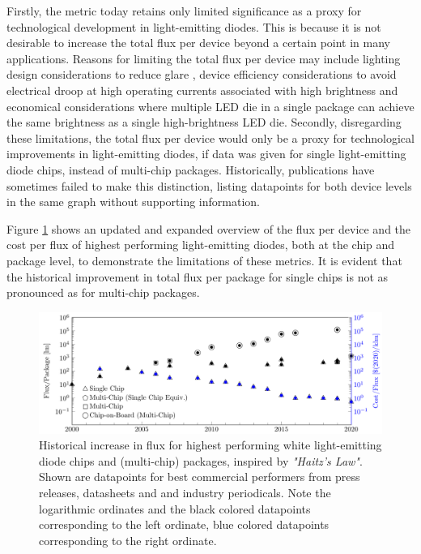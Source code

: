 \documentclass[a4paper,nocompress]{spie}  %
\begin{document}
    Firstly, the metric today retains only limited significance as a proxy for technological development in light-emitting diodes. This is because it is not desirable to increase the total flux per device beyond a certain point in many applications. Reasons for limiting the total flux per device may include lighting design considerations to reduce glare \cite{khan2015led}, device efficiency considerations to avoid electrical droop at high operating currents associated with high brightness \cite{Piprek2010} and economical considerations where multiple LED die in a single package can achieve the same brightness as a single high-brightness LED die. Secondly, disregarding these limitations, the total flux per device would only be a proxy for technological improvements in light-emitting diodes, if data was given for single light-emitting diode chips, instead of multi-chip packages. Historically, publications have sometimes failed to make this distinction, listing datapoints for both device levels in the same graph without supporting information.

    Figure \ref{fig:haitz} shows an updated and expanded overview of the flux per device and the cost per flux of highest performing light-emitting diodes, both at the chip and package level, to demonstrate the limitations of these metrics. It is evident that the historical improvement in total flux per package for single chips is not as pronounced as for multi-chip packages.

    \begin{figure} [ht]
        \begin{center}
            \includegraphics[width=\textwidth]{haitz_law_white.pdf}
        \end{center}
        \caption{Historical increase in flux for highest performing white light-emitting diode chips and (multi-chip) packages, inspired by \textit{"Haitz's Law"}\cite{haitz1999case}. Shown are datapoints for best commercial performers from press releases, datasheets and and industry periodicals. Note the logarithmic ordinates and the black colored datapoints corresponding to the left ordinate, blue colored datapoints corresponding to the right ordinate.}
        \label{fig:haitz}
    \end{figure}
\end{document}
